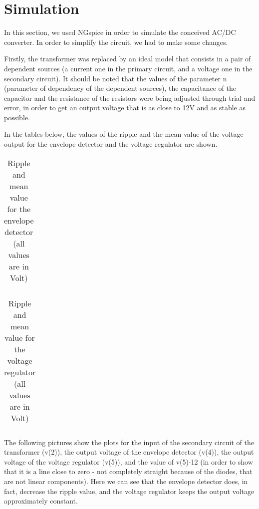 \section{Simulation}
\label{sec:simulation}

\par In this section, we used NGspice in order to simulate the conceived AC/DC converter. In order to simplify the circuit, we had to make some changes.
\par Firstly, the transformer was replaced by an ideal model that consists in a pair of dependent sources (a current one in the primary circuit, and a voltage one in the secondary circuit). It should be noted that the values of the parameter n (parameter of dependency of the dependent sources), the capacitance of the capacitor and the resistance of the resistors were being adjusted through trial and error, in order to get an output voltage that is as close to 12V and as stable as possible.
\par In the tables below, the values of the ripple and the mean value of the voltage output for the envelope detector and the voltage regulator are shown.

\vspace{5mm}
\begin{table}[h!]
\centering
\begin{tabularx}{0.6\textwidth} {
  | >{\raggedright\arraybackslash}X
  | >{\raggedleft\arraybackslash}X | }
 \hline

\end{tabularx}
\caption{\label{tab:Table 3} Ripple and mean value for the envelope detector (all values are in Volt)}
\end{table}
\vspace{5mm}

\begin{table}[h!]
\centering
\begin{tabularx}{0.6\textwidth} {
  | >{\raggedright\arraybackslash}X
  | >{\raggedleft\arraybackslash}X | }
 \hline

\end{tabularx}
\caption{\label{tab:Table 4} Ripple and mean value for the voltage regulator (all values are in Volt)}
\end{table}
\vspace{5mm}

\par The following pictures show the plots for the input of the secondary circuit of the transformer (v(2)), the output voltage of the envelope detector (v(4)), the output voltage of the voltage regulator (v(5)), and the value of v(5)-12 (in order to show that it is a line close to zero - not completely straight because of the diodes, that are not linear components). Here we can see that the envelope detector does, in fact, decrease the ripple value, and the voltage regulator keeps the output voltage approximately constant.


